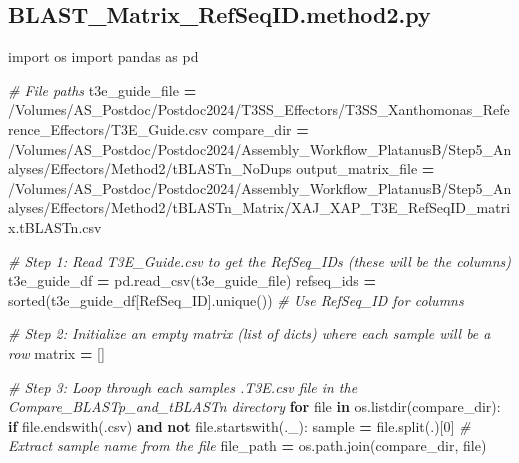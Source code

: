 \documentclass[
]{book}
\newenvironment{Shaded}{\begin{snugshade}}{\end{snugshade}}
\newcommand{\BuiltInTok}[1]{#1}
\newcommand{\CommentTok}[1]{\textcolor[rgb]{0.56,0.35,0.01}{\textit{#1}}}
\newcommand{\ControlFlowTok}[1]{\textcolor[rgb]{0.13,0.29,0.53}{\textbf{#1}}}
\newcommand{\DecValTok}[1]{\textcolor[rgb]{0.00,0.00,0.81}{#1}}
\newcommand{\ImportTok}[1]{#1}
\newcommand{\KeywordTok}[1]{\textcolor[rgb]{0.13,0.29,0.53}{\textbf{#1}}}
\newcommand{\NormalTok}[1]{#1}
\newcommand{\OperatorTok}[1]{\textcolor[rgb]{0.81,0.36,0.00}{\textbf{#1}}}
\newcommand{\StringTok}[1]{\textcolor[rgb]{0.31,0.60,0.02}{#1}}
\begin{document}
\subsection{BLAST\_Matrix\_RefSeqID.method2.py}\label{mxrsmeth2-script}

\begin{Shaded}
\begin{Highlighting}[]
\ImportTok{import}\NormalTok{ os}
\ImportTok{import}\NormalTok{ pandas }\ImportTok{as}\NormalTok{ pd}

\CommentTok{\# File paths}
\NormalTok{t3e\_guide\_file }\OperatorTok{=} \StringTok{\textquotesingle{}/Volumes/AS\_Postdoc/Postdoc2024/T3SS\_Effectors/T3SS\_Xanthomonas\_Reference\_Effectors/T3E\_Guide.csv\textquotesingle{}}
\NormalTok{compare\_dir }\OperatorTok{=} \StringTok{\textquotesingle{}/Volumes/AS\_Postdoc/Postdoc2024/Assembly\_Workflow\_PlatanusB/Step5\_Analyses/Effectors/Method2/tBLASTn\_NoDups\textquotesingle{}}
\NormalTok{output\_matrix\_file }\OperatorTok{=} \StringTok{\textquotesingle{}/Volumes/AS\_Postdoc/Postdoc2024/Assembly\_Workflow\_PlatanusB/Step5\_Analyses/Effectors/Method2/tBLASTn\_Matrix/XAJ\_XAP\_T3E\_RefSeqID\_matrix.tBLASTn.csv\textquotesingle{}}

\CommentTok{\# Step 1: Read T3E\_Guide.csv to get the RefSeq\_IDs (these will be the columns)}
\NormalTok{t3e\_guide\_df }\OperatorTok{=}\NormalTok{ pd.read\_csv(t3e\_guide\_file)}
\NormalTok{refseq\_ids }\OperatorTok{=} \BuiltInTok{sorted}\NormalTok{(t3e\_guide\_df[}\StringTok{\textquotesingle{}RefSeq\_ID\textquotesingle{}}\NormalTok{].unique())  }\CommentTok{\# Use RefSeq\_ID for columns}

\CommentTok{\# Step 2: Initialize an empty matrix (list of dicts) where each sample will be a row}
\NormalTok{matrix }\OperatorTok{=}\NormalTok{ []}

\CommentTok{\# Step 3: Loop through each sample\textquotesingle{}s .T3E.csv file in the Compare\_BLASTp\_and\_tBLASTn directory}
\ControlFlowTok{for} \BuiltInTok{file} \KeywordTok{in}\NormalTok{ os.listdir(compare\_dir):}
    \ControlFlowTok{if} \BuiltInTok{file}\NormalTok{.endswith(}\StringTok{\textquotesingle{}.csv\textquotesingle{}}\NormalTok{) }\KeywordTok{and} \KeywordTok{not} \BuiltInTok{file}\NormalTok{.startswith(}\StringTok{\textquotesingle{}.\_\textquotesingle{}}\NormalTok{):}
\NormalTok{        sample }\OperatorTok{=} \BuiltInTok{file}\NormalTok{.split(}\StringTok{\textquotesingle{}.\textquotesingle{}}\NormalTok{)[}\DecValTok{0}\NormalTok{]  }\CommentTok{\# Extract sample name from the file}
\NormalTok{        file\_path }\OperatorTok{=}\NormalTok{ os.path.join(compare\_dir, }\BuiltInTok{file}\NormalTok{)}
        

\end{Highlighting}
\end{Shaded}
\end{document}
